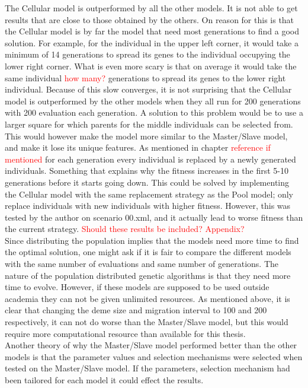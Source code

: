 \noindent The Cellular model is outperformed by all the other models. It is not able to get results that are close to those obtained by the others. On reason for this is that the Cellular model is by far the model that need most generations to find a good solution. For example, for the individual in the upper left corner, it would take a minimum of 14 generations to spread its genes to the individual occupying the lower right corner. What is even more scary is that on average it would take the same individual \textcolor{red}{how many?} generations to spread its genes to the lower right individual. Because of this slow converges, it is not surprising that the Cellular model is outperformed by the other models when they all run for 200 generations with 200 evaluation each generation. A solution to this problem would be to use a larger square for which parents for the middle individuals can be selected from. This would however make the model more similar to the Master/Slave model, and make it lose its unique features. As mentioned in chapter \textcolor{red}{reference if mentioned} for each generation every individual is replaced by a newly generated individuals. Something that explains why the fitness increases in the first 5-10 generations before it starts going down. This could be solved by implementing the Cellular model with the same replacement strategy as the Pool model; only replace individuals with new individuals with higher fitness. However, this was tested by the author on scenario 00.xml, and it actually lead to worse fitness than the current strategy. \textcolor{red}{Should these results be included? Appendix?}\\

\noindent Since distributing the population implies that the models need more time to find the optimal solution, one might ask if it is fair to compare the different models with the same number of evaluations and same number of generations. The nature of the population distributed genetic algorithms is that they need more time to evolve. However, if these models are supposed to be used outside academia they can not be given unlimited resources. As mentioned above, it is clear that changing the deme size and migration interval to 100 and 200 respectively, it can not do worse than the Master/Slave model, but this would require more computational resource than available for this thesis.\\

\noindent Another theory of why the Master/Slave model performed better than the other models is that the parameter values and selection mechanisms were selected when tested on the Master/Slave model. If the parameters, selection mechanism had been tailored for each model it could effect the results.\\

